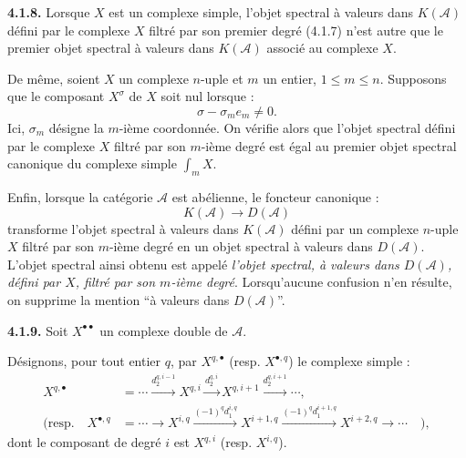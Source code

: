 \clearpage
{}%
\begingroup\small\setlength{\parskip}{0pt}\setlength{\emergencystretch}{1.5em}
\setlength{\abovedisplayskip}{4pt plus 2pt minus 2pt}%
\setlength{\belowdisplayskip}{4pt plus 2pt minus 2pt}%

\noindent\textbf{4.1.8.}\quad
Lorsque $X$ est un complexe simple, l'objet spectral à valeurs dans
$K(\mathcal A)$ défini par le complexe $X$ filtré par son premier degré
(4.1.7) n'est autre que le premier objet spectral à valeurs dans
$K(\mathcal A)$ associé au complexe $X$.

De même, soient $X$ un complexe $n$-uple et $m$ un entier,
$1\leq m\leq n$. Supposons que le composant $X^\sigma$ de $X$ soit nul
lorsque :
\[
\sigma-\sigma_m e_m\neq0.
\]
Ici, $\sigma_m$ désigne la $m$-ième coordonnée.
On vérifie alors que l'objet spectral défini par le complexe $X$ filtré par
son $m$-ième degré est égal au premier objet spectral canonique du complexe
simple $\int_m X$.

Enfin, lorsque la catégorie $\mathcal A$ est abélienne, le foncteur
canonique :
\[
K(\mathcal A)\longrightarrow D(\mathcal A)
\]
transforme l'objet spectral à valeurs dans $K(\mathcal A)$ défini par un
complexe $n$-uple $X$ filtré par son $m$-ième degré en un objet spectral à
valeurs dans $D(\mathcal A)$. L'objet spectral ainsi obtenu est appelé
\emph{l'objet spectral, à valeurs dans $D(\mathcal A)$, défini par $X$,
filtré par son $m$-ième degré}. Lorsqu'aucune confusion n'en résulte, on
supprime la mention ``à valeurs dans $D(\mathcal A)$''.

\medskip\noindent\textbf{4.1.9.}\quad
Soit $X^{\bullet\bullet}$ un complexe double de $\mathcal A$.

Désignons, pour tout entier $q$, par $X^{q,\bullet}$ (resp.
$X^{\bullet,q}$) le complexe simple :
\[
\begin{aligned}
X^{q,\bullet}
&=\cdots\xrightarrow{d_2^{q,i-1}}X^{q,i}
  \xrightarrow{d_2^{q,i}}X^{q,i+1}
  \xrightarrow{d_2^{q,i+1}}\cdots,\\[3pt]
(\text{resp.}\quad X^{\bullet,q}
&=\cdots\longrightarrow X^{i,q}
  \xrightarrow{(-1)^q d_1^{i,q}}X^{i+1,q}
  \xrightarrow{(-1)^q d_1^{i+1,q}}X^{i+2,q}
  \longrightarrow\cdots\quad),
\end{aligned}
\]
dont le composant de degré $i$ est $X^{q,i}$ (resp. $X^{i,q}$).

